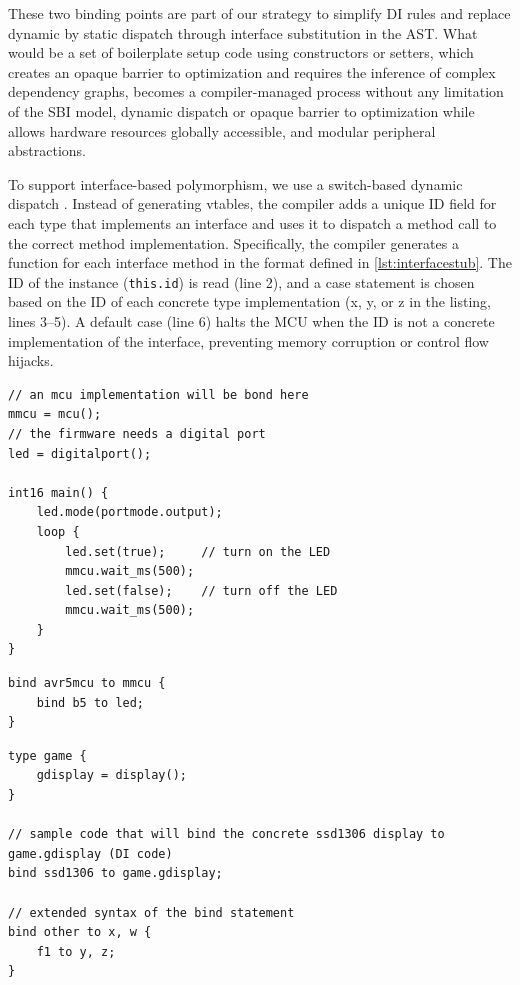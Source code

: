\documentclass[sigconf]{acmart}
\begin{document}
These two binding points are part of our strategy to simplify DI rules and replace dynamic by static dispatch through interface substitution in the AST. What would be a set of boilerplate setup code using constructors or setters, which creates an opaque barrier to optimization and requires the inference of complex dependency graphs, becomes a compiler-managed process without any limitation of the SBI model, dynamic dispatch or opaque barrier to optimization while allows hardware resources globally accessible, and modular peripheral abstractions.

To support interface-based polymorphism, we use a switch-based dynamic dispatch \cite{bauer2021novt}. Instead of generating vtables, the compiler adds a unique ID field for each type that implements an interface and uses it to dispatch a method call to the correct method implementation. Specifically, the compiler generates a function for each interface method in the format defined in \autoref{lst:interfacestub}. The ID of the instance ({\tt this.id}) is read (line 2), and a case statement is chosen based on the ID of each concrete type implementation (x, y, or z in the listing, lines 3--5). A default case (line 6) halts the MCU when the ID is not a concrete implementation of the interface, preventing memory corruption or control flow hijacks.


\begin{lstlisting}[float=tp, caption=A hardware-agnostic LED blink example., label={lst:ledblink}]
// an mcu implementation will be bond here
mmcu = mcu();
// the firmware needs a digital port
led = digitalport();

int16 main() {
	led.mode(portmode.output);
	loop {
		led.set(true);     // turn on the LED
		mmcu.wait_ms(500);
		led.set(false);    // turn off the LED
		mmcu.wait_ms(500);
	}
}
\end{lstlisting}



\begin{lstlisting}[float=tp, caption=DI code for binding an AVR MCU in the LED blink example., label=lst:bind]
bind avr5mcu to mmcu {
	bind b5 to led;
}
\end{lstlisting}



\begin{lstlisting}[float=tp, caption=Binding points in the prototype language., label=lst:bindpoints]
type game {
    gdisplay = display();
}

// sample code that will bind the concrete ssd1306 display to game.gdisplay (DI code)
bind ssd1306 to game.gdisplay;

// extended syntax of the bind statement
bind other to x, w {
    f1 to y, z;
}
\end{lstlisting}
\end{document}
